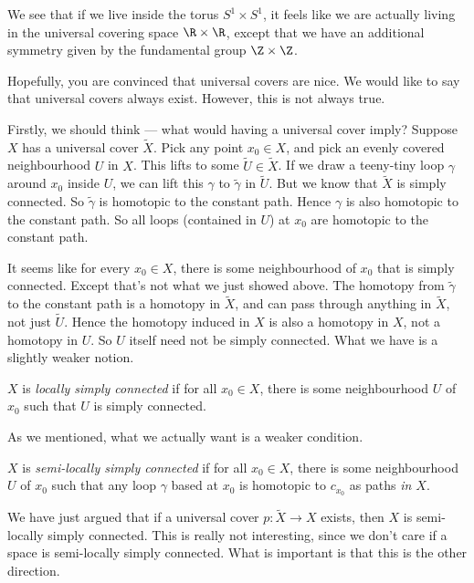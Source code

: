 \documentclass[a4paper]{article}
\begin{document}
We see that if we live inside the torus $S^1 \times S^1$, it feels like we are actually living in the universal covering space $\R \times \R$, except that we have an additional symmetry given by the fundamental group $\Z \times \Z$.

Hopefully, you are convinced that universal covers are nice. We would like to say that universal covers always exist. However, this is not always true.

Firstly, we should think --- what would having a universal cover imply? Suppose $X$ has a universal cover $\tilde{X}$. Pick any point $x_0 \in X$, and pick an evenly covered neighbourhood $U$ in $X$. This lifts to some $\tilde{U} \in \tilde{X}$. If we draw a teeny-tiny loop $\gamma$ around $x_0$ inside $U$, we can lift this $\gamma$ to $\tilde{\gamma}$ in $\tilde{U}$. But we know that $\tilde{X}$ is simply connected. So $\tilde{\gamma}$ is homotopic to the constant path. Hence $\gamma$ is also homotopic to the constant path. So all loops (contained in $U$) at $x_0$ are homotopic to the constant path.

It seems like for every $x_0 \in X$, there is some neighbourhood of $x_0$ that is simply connected. Except that's not what we just showed above. The homotopy from $\tilde{\gamma}$ to the constant path is a homotopy in $\tilde{X}$, and can pass through anything in $\tilde{X}$, not just $\tilde{U}$. Hence the homotopy induced in $X$ is also a homotopy in $X$, not a homotopy in $U$. So $U$ itself need not be simply connected. What we have is a slightly weaker notion.

\begin{defi}
  $X$ is \emph{locally simply connected} if for all $x_0\in X$, there is some neighbourhood $U$ of $x_0$ such that $U$ is simply connected.
\end{defi}

As we mentioned, what we actually want is a weaker condition.
\begin{defi}
  $X$ is \emph{semi-locally simply connected} if for all $x_0 \in X$, there is some neighbourhood $U$ of $x_0$ such that any loop $\gamma$ based at $x_0$ is homotopic to $c_{x_0}$ as paths \emph{in $X$}.
\end{defi}

We have just argued that if a universal cover $p: \tilde{X} \to X$ exists, then $X$ is semi-locally simply connected. This is really not interesting, since we don't care if a space is semi-locally simply connected. What is important is that this is the other direction.
\end{document}
